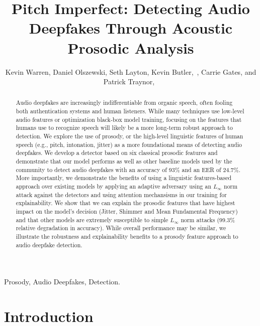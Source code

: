 \documentclass[10pt, journal, anonymous=true]{IEEEtran}
\begin{document}
\title{Pitch Imperfect: Detecting Audio Deepfakes Through Acoustic Prosodic Analysis}
\author{Kevin Warren, Daniel Olszewski, Seth Layton, Kevin Butler,~, Carrie Gates, and Patrick Traynor,~}



\maketitle

\begin{abstract}
Audio deepfakes are increasingly indifferentiable from organic speech, often fooling both authentication systems and human listeners. While many techniques use low-level audio features or optimization black-box model training, focusing on the features that humans use to recognize speech will likely be a more long-term robust approach to detection. We explore the use of prosody, or the high-level linguistic features of human speech (e.g., pitch, intonation, jitter) as a more foundational means of detecting audio deepfakes. We develop a detector based on six classical prosodic features and demonstrate that our model performs as well as other baseline models used by the community to detect audio deepfakes with an accuracy of 93\% and an EER of 24.7\%. More importantly, we demonstrate the benefits of using a linguistic features-based approach over existing models by applying an adaptive adversary using an $L_{\infty}$ norm attack against the detectors and using attention mechansisms in our training for explainability. We show that we can explain the prosodic features that have highest impact on the model's decision (Jitter, Shimmer and Mean Fundamental Frequency) and that other models are extremely susceptible to simple $L_{\infty}$ norm attacks (99.3\% relative degradation in accuracy). While overall performance may be similar, we illustrate the robustness and explainability benefits to a prosody feature approach to audio deepfake detection. 
\end{abstract}

\begin{IEEEkeywords}
Prosody, Audio Deepfakes, Detection.
\end{IEEEkeywords}

\section{Introduction} 
\label{sec:intro} 
\end{document}
